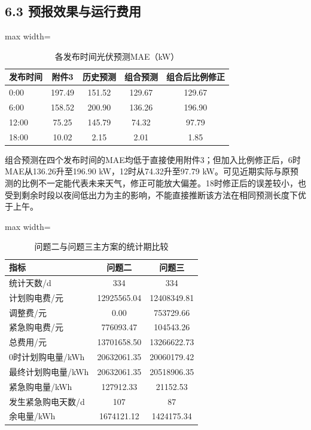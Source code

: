 \documentclass[UTF8,a4paper,zihao=-4,fontset=windows]{ctexart}
\newcommand{\figtabnote}[1]{\par\vspace{3pt}{\fontsize{9}{11}\selectfont\raggedright\noindent 注：#1\par}}
\begin{document}
\subsection{6.3 预报效果与运行费用}
\begin{table}[H]\centering
\fontsize{9.5}{12}\selectfont\setlength{\tabcolsep}{4pt}\renewcommand{\arraystretch}{1.12}
\begin{adjustbox}{max width=\linewidth}\begin{tabular}{lcccc}\toprule
\textbf{发布时间} & \textbf{附件3} & \textbf{历史预测} & \textbf{组合预测} & \textbf{组合后比例修正}\\\midrule
0:00 & 197.49 & 151.52 & 129.67 & 129.67\\
6:00 & 158.52 & 200.90 & 136.26 & 196.90\\
12:00 & 75.25 & 145.79 & 74.32 & 97.79\\
18:00 & 10.02 & 2.15 & 2.01 & 1.85\\
\bottomrule\end{tabular}\end{adjustbox}
\caption{各发布时间光伏预测MAE（kW）}
\figtabnote{按该次发布剩余时段评价。}
\end{table}
组合预测在四个发布时间的MAE均低于直接使用附件3；但加入比例修正后，6时MAE从136.26升至196.90 kW，12时从74.32升至97.79 kW。可见近期实际与原预测的比例不一定能代表未来天气，修正可能放大偏差。18时修正后的误差较小，也受到剩余时段以夜间低出力为主的影响，不能直接推断该方法在相同预测长度下优于上午。
\par
\begin{table}[H]\centering
\fontsize{9.5}{12}\selectfont\setlength{\tabcolsep}{4pt}\renewcommand{\arraystretch}{1.12}
\begin{adjustbox}{max width=\linewidth}\begin{tabular}{lcc}\toprule
\textbf{指标} & \textbf{问题二} & \textbf{问题三}\\\midrule
统计天数/d & 334 & 334\\
计划购电费/元 & 12925565.04 & 12408349.81\\
调整费/元 & 0.00 & 753729.66\\
紧急购电费/元 & 776093.47 & 104543.26\\
总费用/元 & 13701658.50 & 13266622.73\\
0时计划购电量/kWh & 20632061.35 & 20060179.42\\
最终计划购电量/kWh & 20632061.35 & 20518906.35\\
紧急购电量/kWh & 127912.33 & 21152.53\\
发生紧急购电天数/d & 107 & 87\\
余电量/kWh & 1674121.12 & 1424175.34\\
\bottomrule\end{tabular}\end{adjustbox}
\caption{问题二与问题三主方案的统计期比较}
\end{table}
\end{document}
